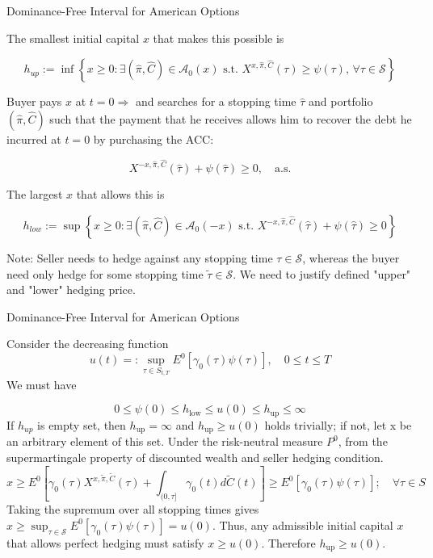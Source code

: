 \documentclass{beamer}
\begin{document}
\begin{frame}{Dominance-Free Interval for American Options}

    {\footnotesize \footnotesize
    The smallest initial capital \(x\) that makes this possible is

    \[
    h_{up} := \inf \left\{ x \geq 0 : \exists (\hat{\pi}, \hat{C}) \in \mathcal{A}_0(x) \text{ s.t. }
     X^{x,\hat{\pi},\hat{C}}(\tau) \geq \psi(\tau), \, \forall \tau \in \mathcal{S} \right\}
    \]

    Buyer pays \(x\) at \(t = 0 \Rightarrow\) and searches for a stopping time \(\hat{\tau}\) 
    and portfolio \((\hat{\pi}, \hat{C})\) such that the payment that he receives allows him to recover
    the debt he incurred at $t=0$ by purchasing the ACC:

    \[
    X^{-x,\hat{\pi},\hat{C}}(\hat{\tau}) + \psi(\hat{\tau}) \geq 0, \quad \text{a.s.}
    \]

     \pause The largest \(x\) that allows this is

    \[
    h_{low} := \sup \left\{ x \geq 0 : \exists (\hat{\pi}, \hat{C}) \in \mathcal{A}_0(-x) \text{ s.t. } 
    X^{-x,\hat{\pi},\hat{C}}(\hat{\tau}) + \psi(\hat{\tau}) \geq 0 \right\}
    \]
    \par Note: Seller needs to hedge against any stopping time \(\tau \in \mathcal{S}\), 
    whereas the buyer need only hedge for some stopping time \(\tilde{\tau} \in \mathcal{S}\). We need to justify
    defined "upper" and "lower" hedging price.
    }
\end{frame} 
\begin{frame}{Dominance-Free Interval for American Options}

    {\footnotesize \footnotesize
    Consider the decreasing function
\[
u(t) =: \sup_{\tau \in S_{t,T}} E^0[\gamma_0(\tau)\psi(\tau)], \quad 0 \leq t \leq T
\]
We must have

\[
0 \leq \psi(0) \leq h_{\text{low}} \leq u(0) \leq h_{\text{up}} \leq \infty
\]
 \pause If $h_{up}$ is empty set, then $h_{\text{up}} = \infty$ and $h_{\text{up}} \geq u(0)$ holds trivially; if not,
let x be an arbitrary element of this set. Under the risk-neutral measure \( P^0 \), 
from the supermartingale property of discounted wealth and seller hedging condition.
\[
x \geq E^0 \left[ \gamma_0(\tau)X^{x,\tilde{\pi},\tilde{C}}(\tau) + \int_{(0,\tau]} 
\gamma_0(t)d\tilde{C}(t) \right] \geq E^0[\gamma_0(\tau)\psi(\tau)]; \quad \forall \tau \in S
\]
 \pause Taking the supremum over all stopping times gives $x \geq \sup_{\tau \in \mathcal{S}} E^0 [\gamma_0(\tau) \psi(\tau)] = u(0).$
Thus, any admissible initial capital \( x \) that allows perfect hedging must satisfy \( x \geq u(0) \). 
Therefore $h_{\text{up}} \geq u(0).$
    }
\end{frame} 
\end{document}
